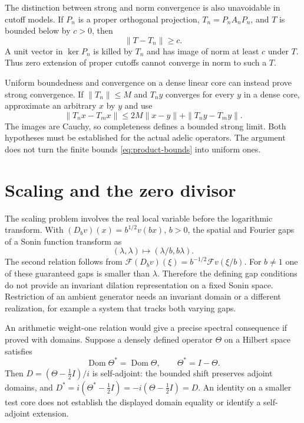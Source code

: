 \documentclass[11pt,letterpaper]{article}
\theoremstyle{definition}
\theoremstyle{remark}
\newcommand{\Dom}{\operatorname{Dom}}
\begin{document}
The distinction between strong and norm convergence is also
unavoidable in cutoff models. If $P_n$ is a proper orthogonal
projection, $T_n=P_nA_nP_n$, and $T$ is bounded below by
$c>0$, then
\begin{equation}
 \|T-T_n\|\ge c.
 \label{eq:norm-obstruction}
\end{equation}
A unit vector in $\ker P_n$ is killed by $T_n$ and has image
of norm at least $c$ under $T$. Thus zero extension of proper
cutoffs cannot converge in norm to such a $T$.

Uniform boundedness and convergence on a dense linear core can
instead prove strong convergence. If $\|T_n\|\le M$ and
$T_ny$ converges for every $y$ in a dense core, approximate
an arbitrary $x$ by $y$ and use
\begin{equation}
 \|T_nx-T_mx\|\le2M\|x-y\|+\|T_ny-T_my\|.
 \label{eq:strong-limit}
\end{equation}
The images are Cauchy, so completeness defines a bounded
strong limit. Both hypotheses must be established for the
actual adelic operators. The argument does not turn the
finite bounds \eqref{eq:product-bounds} into uniform ones.

\section{Scaling and the zero divisor}

The scaling problem involves the real local variable before the
logarithmic transform. With $(D_bv)(x)=b^{1/2}v(bx)$, $b>0$,
the spatial and Fourier gaps of a Sonin function transform as
\begin{equation}
 (\lambda,\lambda)\longmapsto(\lambda/b,b\lambda).
 \label{eq:gaps}
\end{equation}
The second relation follows from
$\mathscr F(D_bv)(\xi)=b^{-1/2}\mathscr Fv(\xi/b)$.
For $b\ne1$ one of these guaranteed gaps is smaller than
$\lambda$. Therefore the defining gap conditions do not
provide an invariant dilation representation on a fixed
Sonin space. Restriction of an ambient generator needs an
invariant domain or a different realization, for example a
system that tracks both varying gaps.

An arithmetic weight-one relation would give a precise spectral
consequence if proved with domains. Suppose a densely defined
operator $\Theta$ on a Hilbert space satisfies
\begin{equation}
 \Dom\Theta^*=\Dom\Theta,\qquad \Theta^*=I-\Theta.
 \label{eq:adjoint}
\end{equation}
Then $D=(\Theta-\tfrac12I)/i$ is self-adjoint: the bounded
shift preserves adjoint domains, and
$D^*=i(\Theta^*-\tfrac12I)=-i(\Theta-\tfrac12I)=D$.
An identity on a smaller test core does not establish the
displayed domain equality or identify a self-adjoint extension.
\end{document}
